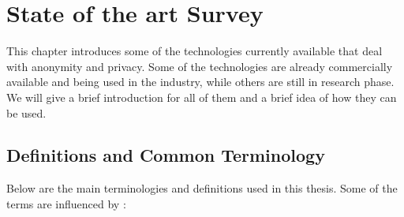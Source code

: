\chapter{State of the art Survey}

This chapter introduces some of the technologies currently available that deal with anonymity and privacy. Some of the technologies are already commercially available and being used in the industry, while others are still in research phase. We will give a brief introduction for all of them and a brief idea of how they can be used.

\section{Definitions and Common Terminology}
Below are the main terminologies and definitions used in this thesis. Some of the terms are influenced by \cite{goldberg2000pseudonymous}:
